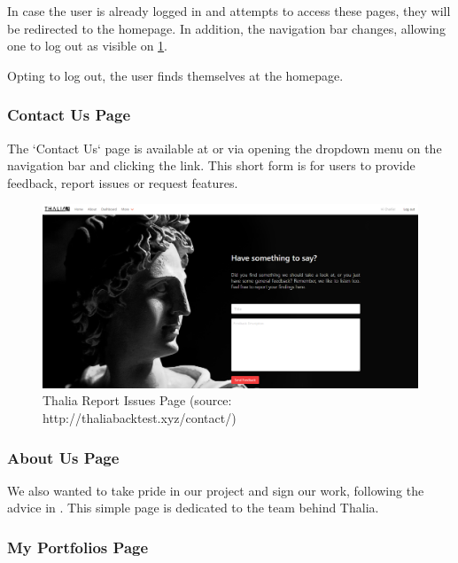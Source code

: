 \documentclass[main.tex]{subfiles}
\begin{document}
In case the user is already logged in and attempts to access these pages, they will be redirected to the homepage. In addition, the navigation bar changes, allowing one to log out as visible on \figurename{\ref{thalia_issues}}.

Opting to log out, the user finds themselves at the homepage.

\subsubsection{Contact Us Page}

The `Contact Us` page is available at  or via opening the dropdown menu on the navigation bar and clicking the link. This short form is for users to provide feedback, report issues or request features.

\begin{figure}[H]
   \centering
   \includegraphics[width=\textwidth]{08Appendices/081User/081Pictures/issues.png}
   \caption{Thalia Report Issues Page (source: http://thaliabacktest.xyz/contact/)}
   \label{thalia_issues}
\end{figure}

\subsubsection{About Us Page}
We also wanted to take pride in our project and sign our work, following the advice in \cite{pragmaticprog}. This simple page is dedicated to the team behind Thalia.

\subsubsection{My Portfolios Page}
\end{document}
